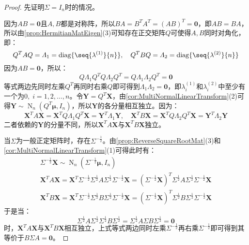 \begin{proof}
	先证明$\Sigma=I_n$时的情况。\par
	因为$AB=\mathbf{0}$且$A,B$都是对称阵，所以$BA=B^TA^T=(AB)^T=\mathbf{0}$，即$AB=BA$，所以由\cref{prop:HermitianMatEigen}(3)可知存在正交矩阵$Q$可使得$A,B$同时对角化，即：
	\begin{equation*}
		Q^TAQ=\varLambda_1=\operatorname{diag}\{\seq{\lambda^{(1)}}{n}\},\quad Q^TBQ=\varLambda_2=\operatorname{diag}\{\seq{\lambda^{(2)}}{n}\}
	\end{equation*}
	因为$AB=\mathbf{0}$，所以：
	\begin{equation*}
		Q\varLambda_1Q^TQ\varLambda_2Q^T=Q\varLambda_1\varLambda_2Q^T=\mathbf{0}
	\end{equation*}
	等式两边先同时左乘$Q^T$再同时右乘$Q$即可得到$\varLambda_1\varLambda_2=\mathbf{0}$，即$\lambda_i^{(1)}$和$\lambda_i^{(2)}$中至少有一个为$0,\;i=1,2,\dots,n$。令$\mathbf{Y}=Q^T\mathbf{X}$，由\cref{cor:MultiNormalLinearTransform}(2)可得$\mathbf{Y}\sim\operatorname{N}_n(Q^T\boldsymbol{\mu},I_n)$，所以$\mathbf{Y}$的各分量相互独立。因为：
	\begin{equation*}
		\mathbf{X}^TA\mathbf{X}=\mathbf{X}^TQ\varLambda_1Q^T\mathbf{X}=\mathbf{Y}^T\varLambda_1\mathbf{Y},\quad\mathbf{X}^TB\mathbf{X}=\mathbf{X}^TQ\varLambda_2Q^T\mathbf{X}=\mathbf{Y}^T\varLambda_2\mathbf{Y}
	\end{equation*}
	二者依赖的$\mathbf{Y}$的分量不同，所以$\mathbf{X}^TA\mathbf{X}$与$\mathbf{X}^TB\mathbf{X}$独立。\par
	当$\Sigma$为一般正定矩阵时，存在$\Sigma^{-\frac{1}{2}}$。由\cref{prop:ReverseSquareRootMat}(3)和\cref{cor:MultiNormalLinearTransform}(1)可得此时有：
	\begin{gather*}
		\Sigma^{-\frac{1}{2}}\mathbf{X}\sim\operatorname{N}_n(\Sigma^{-\frac{1}{2}}\boldsymbol{\mu},I_n) \\
		\mathbf{X}^TA\mathbf{X}=\mathbf{X}^T\Sigma^{-\frac{1}{2}}\Sigma^{\frac{1}{2}}A\Sigma^{\frac{1}{2}}\Sigma^{-\frac{1}{2}}\mathbf{X}=(\Sigma^{-\frac{1}{2}}\mathbf{X})^T\Sigma^{\frac{1}{2}}A\Sigma^{\frac{1}{2}}\Sigma^{-\frac{1}{2}}\mathbf{X} \\
		\mathbf{X}^TB\mathbf{X}=\mathbf{X}^T\Sigma^{-\frac{1}{2}}\Sigma^{\frac{1}{2}}B\Sigma^{\frac{1}{2}}\Sigma^{-\frac{1}{2}}\mathbf{X}=(\Sigma^{-\frac{1}{2}}\mathbf{X})^T\Sigma^{\frac{1}{2}}B\Sigma^{\frac{1}{2}}\Sigma^{-\frac{1}{2}}\mathbf{X}
	\end{gather*}
	于是当：
	\begin{equation*}
		\Sigma^{\frac{1}{2}}A\Sigma^{\frac{1}{2}}\Sigma^{\frac{1}{2}}B\Sigma^{\frac{1}{2}}=\Sigma^{\frac{1}{2}}A\Sigma B\Sigma^{\frac{1}{2}}=\mathbf{0}
	\end{equation*}
	时，$\mathbf{X}^TA\mathbf{X}$与$\mathbf{X}^TB\mathbf{X}$相互独立，上式等式两边同时左乘$\Sigma^{-\frac{1}{2}}$再右乘$\Sigma^{-\frac{1}{2}}$即可得到其等价于$B\Sigma A=\mathbf{0}$。
\end{proof}


